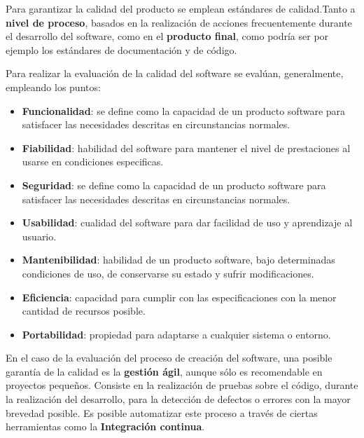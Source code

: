 Para garantizar la calidad del producto se emplean estándares de calidad.Tanto a\textbf{ nivel de proceso}, basados en la realización de acciones frecuentemente durante el desarrollo del software, como en el \textbf{producto final}, como podría ser por ejemplo los estándares de documentación y de código. 

Para realizar la evaluación de la calidad del software se evalúan, generalmente, empleando los puntos:
\begin{itemize}
	\item \textbf{Funcionalidad}: se define como la capacidad de un producto software para satisfacer las necesidades descritas en circunstancias normales.
	\item \textbf{Fiabilidad}: habilidad del software para mantener el nivel de prestaciones al usarse en condiciones especificas.
	\item \textbf{Seguridad}: se define como la capacidad de un producto software para satisfacer las necesidades descritas en circunstancias normales.
	\item \textbf{Usabilidad}: cualidad del software para dar facilidad de uso y aprendizaje al usuario.
	\item \textbf{Mantenibilidad}: habilidad de un producto software, bajo determinadas condiciones de uso, de conservarse su estado y sufrir modificaciones.
	\item \textbf{Eficiencia}: capacidad  para cumplir con las especificaciones con la menor cantidad de recursos posible.
	\item \textbf{Portabilidad}: propiedad para adaptarse a cualquier sistema o entorno.
\end{itemize}

En el caso de la evaluación del proceso de creación del software, una posible garantía de la calidad es la \textbf{gestión ágil}, aunque sólo es recomendable en proyectos pequeños. Consiste en la realización de pruebas sobre el código, durante la realización del desarrollo, para la detección de defectos o errores con la mayor brevedad posible. Es posible automatizar este proceso a través de ciertas herramientas como la \textbf{Integración continua}.

